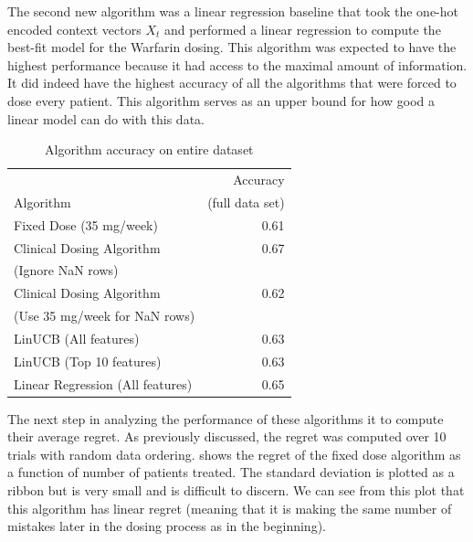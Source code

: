 \documentclass{article}
\begin{document}
The second new algorithm was a linear regression baseline that took the one-hot encoded context vectors $X_t$ and performed a linear regression to compute the best-fit model for the Warfarin dosing. This algorithm was expected to have the highest performance because it had access to the maximal amount of information. It did indeed have the highest accuracy of all the algorithms that were forced to dose every patient. This algorithm serves as an upper bound for how good a linear model can do with this data. 

\begin{table}[t]
\caption{Algorithm accuracy on entire dataset}
\label{accuracy-table}
\vskip 0.15in
\begin{center}
\begin{small}
\begin{sc}
\begin{tabular}{lr}
\toprule
 & Accuracy \\
Algorithm & (full data set) \\
\midrule
Fixed Dose (35 mg/week)    & 0.61  \\
Clinical Dosing Algorithm  &  0.67  \\
\quad (Ignore NaN rows) & \\
Clinical Dosing Algorithm     & 0.62 \\
\quad (Use 35 mg/week for NaN rows) & \\
LinUCB  (All features)  & 0.63 \\
LinUCB (Top 10 features) & 0.63 \\
Linear Regression (All features) & 0.65 \\
\bottomrule
\end{tabular}
\end{sc}
\end{small}
\end{center}
\vskip -0.1in
\end{table}

The next step in analyzing the performance of these algorithms it to compute their average regret. As previously discussed, the regret was computed over 10 trials with random data ordering.  shows the regret of the fixed dose algorithm as a function of number of patients treated. The standard deviation is plotted as a ribbon but is very small and is difficult to discern. We can see from this plot that this algorithm has linear regret (meaning that it is making the same number of mistakes later in the dosing process as in the beginning). 
\end{document}
